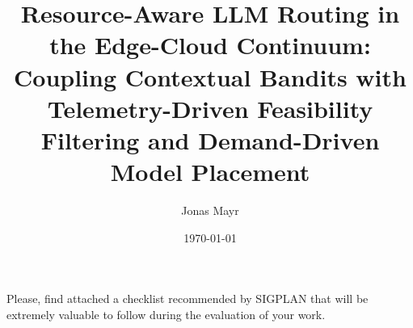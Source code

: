 \documentclass[english]{DPSbachelor}
\begin{document}
    \title{Resource-Aware LLM Routing in the Edge-Cloud Continuum: Coupling Contextual Bandits with Telemetry-Driven Feasibility Filtering and Demand-Driven Model Placement}

    \author{Jonas Mayr}
    \mailaddress{}
    \date{\today}
    \supervisor{}

    \maketitle
    \abstract{}

    

    \tableofcontents

    
    
    
    
    

    \appendix

    Please, find attached a checklist recommended by SIGPLAN that will be extremely valuable to follow during the evaluation of your work. 
    
\end{document}
